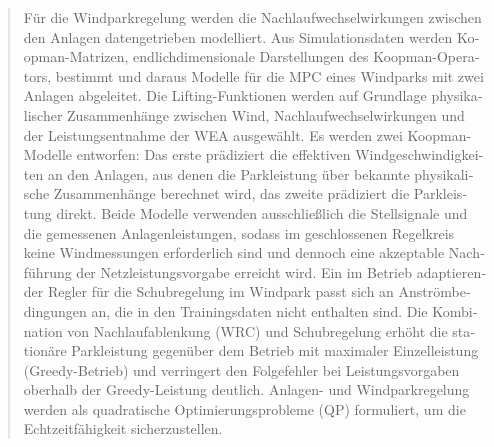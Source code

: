 \documentclass[12pt,a4paper,twoside,openright]{report}
\begin{document}
\begin{otherlanguage}{ngerman}
{\begin{abstract}
Für die Windparkregelung werden die Nachlaufwechselwirkungen zwischen den Anlagen datengetrieben modelliert. Aus Simulationsdaten werden Koopman-Matrizen, endlichdimensionale Darstellungen des Koopman-Operators, bestimmt und daraus Modelle für die MPC eines Windparks mit zwei Anlagen abgeleitet. Die Lifting-Funktionen werden auf Grundlage physikalischer Zusammenhänge zwischen Wind, Nachlaufwechselwirkungen und der Leistungsentnahme der WEA ausgewählt. Es werden zwei Koopman-Modelle entworfen: Das erste prädiziert die effektiven Windgeschwindigkeiten an den Anlagen, aus denen die Parkleistung über bekannte physikalische Zusammenhänge berechnet wird, das zweite prädiziert die Parkleistung direkt. Beide Modelle verwenden ausschließlich die Stellsignale und die gemessenen Anlagenleistungen, sodass im geschlossenen Regelkreis keine Windmessungen erforderlich sind und dennoch eine akzeptable Nachführung der Netzleistungsvorgabe erreicht wird. Ein im Betrieb adaptierender Regler für die Schubregelung im Windpark passt sich an Anströmbedingungen an, die in den Trainingsdaten nicht enthalten sind. Die Kombination von Nachlaufablenkung (WRC) und Schubregelung erhöht die stationäre Parkleistung gegenüber dem Betrieb mit maximaler Einzelleistung (Greedy-Betrieb) und verringert den Folgefehler bei Leistungsvorgaben oberhalb der Greedy-Leistung deutlich. Anlagen- und Windparkregelung werden als quadratische Optimierungsprobleme (QP) formuliert, um die Echtzeitfähigkeit sicherzustellen.
  \end{abstract}}
\end{otherlanguage}

\cleardoublepage
\pagestyle{fancy}   %

\tableofcontents
    
\makeatletter
\begingroup
\let\addcontentsline\@gobblethree

\endgroup
\makeatother

    
    
    
    
    
    
    
    \appendix
    
   
    
    
    \cleardoublepage
 
     
\end{document}
